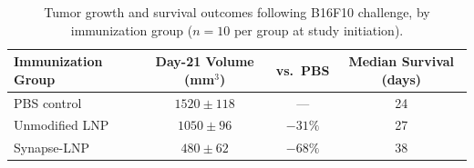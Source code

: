 \begin{table}[htbp]
\centering
\caption{Tumor growth and survival outcomes following B16F10 challenge, by immunization group ($n = 10$ per group at study initiation).}
\label{tab:tumor}
\vspace{0.2cm}
\begin{tabularx}{\textwidth}{Xccc}
\toprule
\textbf{Immunization Group} & \textbf{Day-21 Volume (mm$^{3}$)} & \textbf{vs.\ PBS} & \textbf{Median Survival (days)} \\
\midrule
PBS control & $1520 \pm 118$ & --- & 24 \\
Unmodified LNP & $1050 \pm 96$ & $-31\%$ & 27 \\
Synapse-LNP & $480 \pm 62$ & $-68\%$ & 38 \\
\bottomrule
\end{tabularx}
\end{table}
